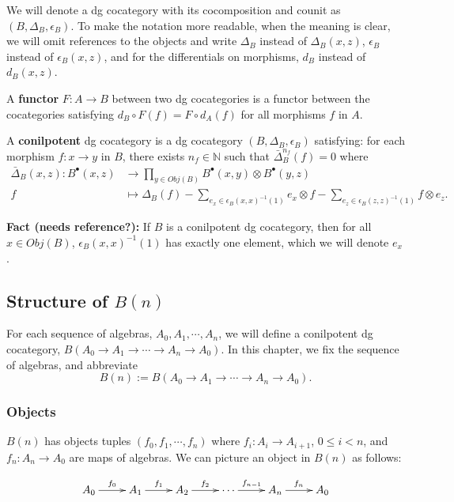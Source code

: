 We will denote a dg cocategory with its 
cocomposition and counit as $(B, \Delta_B, 
\epsilon_B)$. To make the notation more 
readable, when the meaning is clear, 
we will omit references to the 
objects and write $\Delta_B$ instead of 
$\Delta_B(x,z)$, $\epsilon_B$ instead of 
$\epsilon_B(x,z)$, and for the differentials 
on morphisms, $d_B$ instead of $d_B(x,z)$.
%
\begin{defn} A \textbf{functor} $F: A \to B$ 
between two dg cocategories is a functor 
between the cocategories satisfying 
$d_B\circ F(f) = F\circ d_A(f)$ for all 
morphisms $f$ in $A$.
\end{defn}
%
\begin{defn} A \textbf{conilpotent} dg 
cocategory is a dg cocategory $(B, 
\Delta_B, \epsilon_B)$ satisfying: for each 
morphism $f:x\to y$ in $B$, there exists 
$n_f \in \mathbb{N}$ such that 
$\bar{\Delta}_B^{n_f}(f) = 0$
where
\begin{align*}
\bar{\Delta}_B(x,z): B^\bullet(x,z) 
&\to 
  \prod \limits_{y \in Obj(B)} 
  B^\bullet(x,y) \otimes
  B^\bullet(y,z)\\
f
&\mapsto
\Delta_B(f)
- \sum \limits_{e_x \in 
  \epsilon_B(x,x)^{-1}(1)}
  e_x \otimes f
- \sum \limits_{e_z \in 
  \epsilon_B(z,z)^{-1}(1)}
  f \otimes e_z. 
\end{align*}
\end{defn}
%
\textbf{Fact (needs reference?):} 
If $B$ is a conilpotent dg cocategory, 
then for all $x \in Obj(B)$, 
$\epsilon_B(x,x)^{-1}(1)$ has exactly 
one element, which we will denote $e_x$.
%
\subsection{Structure of $B(n)$}
For each sequence of algebras, 
$A_0, A_1, \cdots, A_n$, 
we will define a conilpotent dg cocategory, 
$B(A_0 \to A_1 \to \cdots \to A_n \to A_0)$. 
In this chapter, we fix the sequence of 
algebras, and abbreviate 
$$
B(n):= B(A_0 \to A_1 \to \cdots \to A_n \to A_0).
$$
%
\subsubsection{Objects}
$B(n)$ has objects tuples $(f_0, f_1, \cdots, f_n)$ where $f_i : A_i \to A_{i+1}$, $0 \leq i < n$,
and $f_n: A_n \to A_0$ are maps of algebras. We can picture an object in $B(n)$ as follows:

\begin{equation*}
\xymatrix{
A_0 \ar[r]^{f_0}
& A_1 \ar[r]^{f_1}
& A_2 \ar[r]^{f_2}
& \cdots \ar[r]^{f_{n-1}}
& A_n \ar[r]^{f_n}
& A_0
}
\end{equation*}

